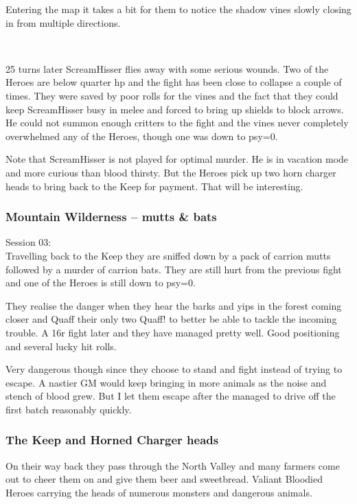 Entering the map it takes a bit for them to notice the shadow vines slowly closing in from multiple directions.

\

25 turns later ScreamHisser flies away with some serious wounds. Two of the Heroes are below quarter hp and the fight has been close to collapse a couple of times. They were saved by poor rolls for the vines and the fact that they could keep ScreamHisser busy in melee and forced to bring up shields to block arrows. He could not summon enough critters to the fight and the vines never completely overwhelmed any of the Heroes, though one was down to psy=0.

\begin{readoutloud}
Note that ScreamHisser is not played for optimal murder. He is in vacation mode and more curious than blood thirsty. But the Heroes pick up two horn charger heads to bring back to the Keep for payment. That will be interesting.
\end{readoutloud}



\subsubsection*{Mountain Wilderness -- mutts \& bats}
\forceindent Session 03:\\                                              %
Travelling back to the Keep they are sniffed down by a pack of carrion mutts followed by a murder of carrion bats.
They are still hurt from the previous fight and one of the Heroes is still down to psy=0.

They realise the danger when they hear the barks and yips in the forest coming closer and Quaff their only two Quaff! to better be able to tackle the incoming trouble.
A 16r fight later and they have managed pretty well. Good positioning and several lucky hit rolls.

\begin{readoutloud}
Very dangerous though since they choose to stand and fight instead of trying to escape. A nastier GM would keep bringing in more animals as the noise and stench of blood grew. But I let them escape after the managed to drive off the first batch reasonably quickly.
\end{readoutloud}


\subsubsection*{The Keep and Horned Charger heads}
On their way back they pass through the North Valley and many farmers come out to cheer them on and give them beer and sweetbread. Valiant Bloodied Heroes carrying the heads of numerous monsters and dangerous animals.


